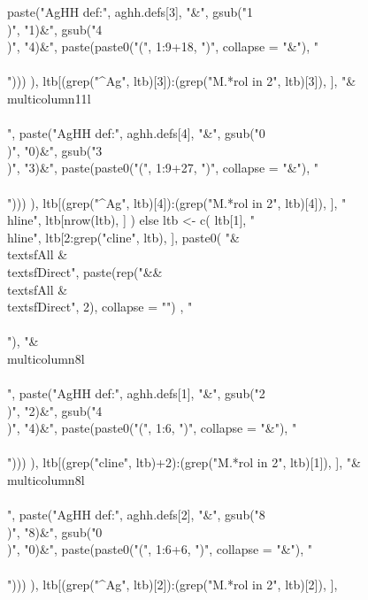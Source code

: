 \begin{Schunk}
\begin{Sinput}
{      paste("AgHH def:", aghh.defs[3], "&",
        gsub("1\\)", "1)&", gsub("4\\)", "4)&", paste(paste0("(", 1:9+18, ")", collapse = "&"), "\\\\")))
        ),
      ltb[(grep("^Ag", ltb)[3]):(grep("M.*rol in 2", ltb)[3]), ], 
      "&\\multicolumn{11}{l}{}\\\\",
      paste("AgHH def:", aghh.defs[4], "&",
        gsub("0\\)", "0)&", gsub("3\\)", "3)&", paste(paste0("(", 1:9+27, ")", collapse = "&"), "\\\\")))
        ),
      ltb[(grep("^Ag", ltb)[4]):(grep("M.*rol in 2", ltb)[4]), ],
      "\\hline",
        ltb[nrow(ltb), ]
      ) else
    ltb <- c(
      ltb[1], 
      "\\hline", 
      ltb[2:grep("cline", ltb), ],
      paste0(
        "&\\textsf{All} & \\textsf{Direct}",
        paste(rep("&&\\textsf{All} & \\textsf{Direct}", 2), collapse = "")
        , "\\\\"),
      "&\\multicolumn{8}{l}{}\\\\",
      paste("AgHH def:", aghh.defs[1], "&",
        gsub("2\\)", "2)&", gsub("4\\)", "4)&", paste(paste0("(", 1:6, ")", collapse = "&"), "\\\\")))
        ),
      ltb[(grep("cline", ltb)+2):(grep("M.*rol in 2", ltb)[1]), ], 
      "&\\multicolumn{8}{l}{}\\\\",
      paste("AgHH def:", aghh.defs[2], "&",
        gsub("8\\)", "8)&", gsub("0\\)", "0)&", paste(paste0("(", 1:6+6, ")", collapse = "&"), "\\\\")))
        ),
      ltb[(grep("^Ag", ltb)[2]):(grep("M.*rol in 2", ltb)[2]), ],
}
\end{Sinput}
\end{Schunk}
